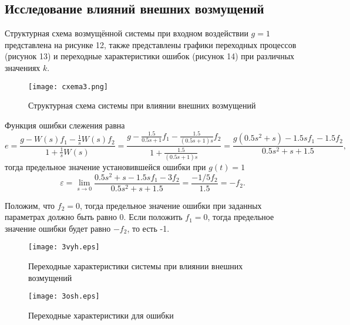 \documentclass[12pt,a4paper]{article}
\begin{document}
\newpage
\begin{center}
\section{Исследование влияний внешних возмущений}
\end{center}\par
Структурная схема возмущённой системы при входном воздействии $g=1$ представлена на рисунке 12, также представлены графики переходных процессов (рисунок 13) и переходные характеристики ошибок (рисунок 14) при различных значениях $k$.
\begin{figure}[H]
    \centering
    \texttt{[image: cxema3.png]}
    \caption{Структурная схема системы при влиянии внешних возмущений}
\end{figure}
Функция ошибки слежения равна
\begin{equation}
e = \frac{g - W(s)f_1 - \displaystyle{\frac{1}{s}}W(s)f_2}{1 + \displaystyle{\frac{1}{s}}W(s)} = \frac{g - \displaystyle{\frac{1.5}{0.5s + 1}}f_1 - \displaystyle{\frac{1.5}{(0.5s + 1)s}}f_2}{1 + \displaystyle{\frac{1.5}{(0.5s + 1)s}}} = \frac{g(0.5s^2 + s) - 1.5sf_1 - 1.5f_2}{0.5s^2 + s + 1.5},
\end{equation}
тогда предельное значение установившейся ошибки при $g(t) = 1$
\begin{equation}
\varepsilon = \lim_{s \to 0} \frac{0.5s^2 + s - 1.5sf_1 - 3f_2}{0.5s^2 + s + 1.5} = \frac{-1/5f_2}{1.5} = -f_2.
\end{equation}\par
Положим, что $f_2=0$, тогда предельное значение ошибки при заданных параметрах должно быть равно 0. Если положить  $f_1=0$, тогда предельное значение ошибки будет равно $-f_2$, то есть -1.
\begin{figure}[H]
    \centering
    \texttt{[image: 3vyh.eps]}
    \caption{Переходные характеристики системы при влиянии внешних возмущений}
\end{figure}
\begin{figure}[H]
    \centering
    \texttt{[image: 3osh.eps]}
    \caption{Переходные характеристики для ошибки}
\end{figure}
\end{document}
